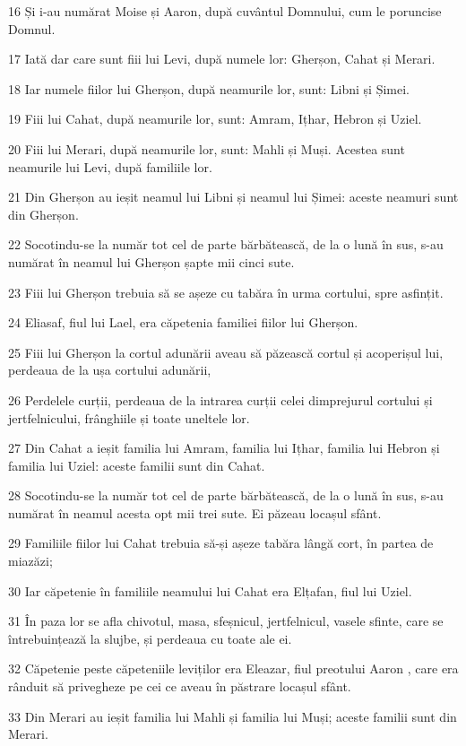 \par 16 Și i-au numărat Moise și Aaron, după cuvântul Domnului, cum le poruncise Domnul.
\par 17 Iată dar care sunt fiii lui Levi, după numele lor: Gherșon, Cahat și Merari.
\par 18 Iar numele fiilor lui Gherșon, după neamurile lor, sunt: Libni și Șimei.
\par 19 Fiii lui Cahat, după neamurile lor, sunt: Amram, Ițhar, Hebron și Uziel.
\par 20 Fiii lui Merari, după neamurile lor, sunt: Mahli și Muși. Acestea sunt neamurile lui Levi, după familiile lor.
\par 21 Din Gherșon au ieșit neamul lui Libni și neamul lui Șimei: aceste neamuri sunt din Gherșon.
\par 22 Socotindu-se la număr tot cel de parte bărbătească, de la o lună în sus, s-au numărat în neamul lui Gherșon șapte mii cinci sute.
\par 23 Fiii lui Gherșon trebuia să se așeze cu tabăra în urma cortului, spre asfințit.
\par 24 Eliasaf, fiul lui Lael, era căpetenia familiei fiilor lui Gherșon.
\par 25 Fiii lui Gherșon la cortul adunării aveau să păzească cortul și acoperișul lui, perdeaua de la ușa cortului adunării,
\par 26 Perdelele curții, perdeaua de la intrarea curții celei dimprejurul cortului și jertfelnicului, frânghiile și toate uneltele lor.
\par 27 Din Cahat a ieșit familia lui Amram, familia lui Ițhar, familia lui Hebron și familia lui Uziel: aceste familii sunt din Cahat.
\par 28 Socotindu-se la număr tot cel de parte bărbătească, de la o lună în sus, s-au numărat în neamul acesta opt mii trei sute. Ei păzeau locașul sfânt.
\par 29 Familiile fiilor lui Cahat trebuia să-și așeze tabăra lângă cort, în partea de miazăzi;
\par 30 Iar căpetenie în familiile neamului lui Cahat era Elțafan, fiul lui Uziel.
\par 31 În paza lor se afla chivotul, masa, sfeșnicul, jertfelnicul, vasele sfinte, care se întrebuințează la slujbe, și perdeaua cu toate ale ei.
\par 32 Căpetenie peste căpeteniile leviților era Eleazar, fiul preotului Aaron , care era rânduit să privegheze pe cei ce aveau în păstrare locașul sfânt.
\par 33 Din Merari au ieșit familia lui Mahli și familia lui Muși; aceste familii sunt din Merari.
